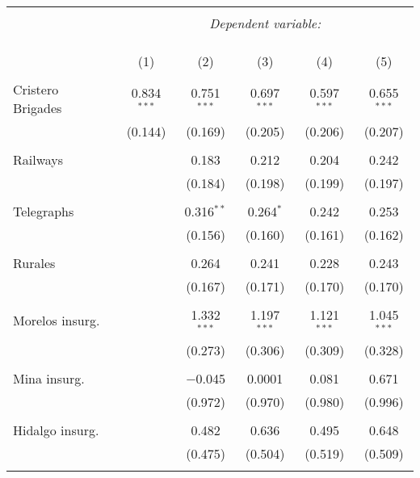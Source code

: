 
\begin{table}[!htbp] \centering 
  \caption{} 
  \label{} 
\begin{tabular}{@{\extracolsep{5pt}}lccccc} 
\\[-1.8ex]\hline 
\hline \\[-1.8ex] 
 & \multicolumn{5}{c}{\textit{Dependent variable:}} \\ 
\cline{2-6} 
\\[-1.8ex] & \multicolumn{5}{c}{ } \\ 
\\[-1.8ex] & (1) & (2) & (3) & (4) & (5)\\ 
\hline \\[-1.8ex] 
 Cristero Brigades & 0.834$^{***}$ & 0.751$^{***}$ & 0.697$^{***}$ & 0.597$^{***}$ & 0.655$^{***}$ \\ 
  & (0.144) & (0.169) & (0.205) & (0.206) & (0.207) \\ 
  & & & & & \\ 
 Railways &  & 0.183 & 0.212 & 0.204 & 0.242 \\ 
  &  & (0.184) & (0.198) & (0.199) & (0.197) \\ 
  & & & & & \\ 
 Telegraphs &  & 0.316$^{**}$ & 0.264$^{*}$ & 0.242 & 0.253 \\ 
  &  & (0.156) & (0.160) & (0.161) & (0.162) \\ 
  & & & & & \\ 
 Rurales &  & 0.264 & 0.241 & 0.228 & 0.243 \\ 
  &  & (0.167) & (0.171) & (0.170) & (0.170) \\ 
  & & & & & \\ 
 Morelos insurg. &  & 1.332$^{***}$ & 1.197$^{***}$ & 1.121$^{***}$ & 1.045$^{***}$ \\ 
  &  & (0.273) & (0.306) & (0.309) & (0.328) \\ 
  & & & & & \\ 
 Mina insurg. &  & $-$0.045 & 0.0001 & 0.081 & 0.671 \\ 
  &  & (0.972) & (0.970) & (0.980) & (0.996) \\ 
  & & & & & \\ 
 Hidalgo insurg. &  & 0.482 & 0.636 & 0.495 & 0.648 \\ 
  &  & (0.475) & (0.504) & (0.519) & (0.509) \\ 
  & & & & & \\ 

\end{tabular}
\end{table}
